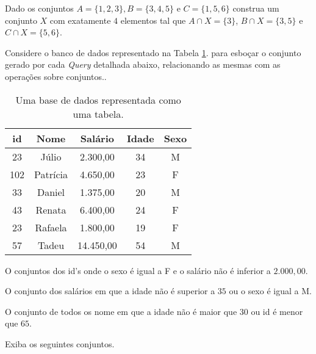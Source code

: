 \begin{problem}\label{prob:Conjuntos12}
	Dado os conjuntos $A = \{1, 2, 3\}, B = \{3,4,5\}$ e $C = \{1, 5, 6\}$ construa um conjunto $X$ com exatamente $4$ elementos tal que $A \cap X = \{3\}$, $B \cap X =\{3, 5\}$ e $C \cap X = \{5, 6\}$.
\end{problem}

\begin{problem}\label{prob:Conjuntos13}
	Considere o banco de dados representado na Tabela  \ref{tab:TabelaBaseDeDados1}. para esboçar o conjunto gerado por cada  \textit{Query} detalhada abaixo, relacionando as mesmas com as operações sobre conjuntos..
\end{problem}

\begin{table}[h]
	\centering
	\begin{tabular}{ccccc}
		\hline
		id & Nome & Salário & Idade & Sexo \\
		\hline
		23 & Júlio & 2.300,00 & 34 & M \\
		102 & Patrícia & 4.650,00 & 23 & F \\
		33 & Daniel & 1.375,00 & 20 & M \\
		43 & Renata & 6.400,00 & 24 & F \\
		23 & Rafaela & 1.800,00 & 19 & F \\
		57 & Tadeu & 14.450,00 & 54 & M \\
		\hline
	\end{tabular}
	\caption{Uma base de dados representada como uma tabela.}
	\label{tab:TabelaBaseDeDados1}
\end{table}

\begin{exerList}
	\item O conjuntos dos id's onde o sexo é igual a F e o salário não é inferior a $2.000,00$.
	\item O conjunto dos salários em que a idade não é superior a $35$ ou o sexo é igual a M.
	\item O conjunto de todos os nome em que a idade não é maior que $30$ ou id é menor que $65$.
\end{exerList}

\begin{problem}\label{prob:Conjuntos14}
	Exiba os seguintes conjuntos.
\end{problem}

